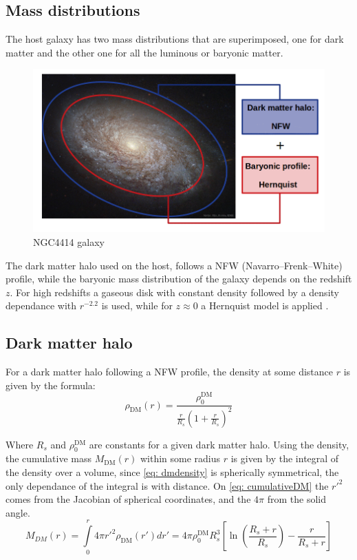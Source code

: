 		
		
		
	\subsection{Mass distributions}
		The host galaxy has two mass distributions that are superimposed, one for dark matter and the other one for all the luminous or baryonic matter.
		\begin{figure}[h]
			\centering
			\includegraphics[width=0.7\linewidth]{Figures/NGC4414_modified}
			\caption{NGC4414 galaxy }
		\end{figure}
	
		The dark matter halo used on the host, follows a NFW (Navarro–Frenk–White) profile, while the baryonic mass distribution of the galaxy depends on the redshift $z$. For high redshifts a gaseous disk with constant density followed by a density dependance with $r^{-2.2}$ is used, while for $z \approx 0$ a Hernquist model is applied \cite{choksi2017recoiling}.
		
	\subsection{Dark matter halo}
		For a dark matter halo following a NFW profile, the density at some distance $r$ is given by the formula:
		\begin{equation}\label{eq: dmdensity}
			\rho_\text{DM}(r) = \dfrac{\rho_0^\text{DM}}{\frac{r}{R_s}\left(1 + \frac{r}{R_s}\right)^2}
		\end{equation}
		
		Where $R_s$ and $\rho_0^\text{DM}$ are constants for a given dark matter halo. Using the density, the cumulative mass $M_\text{DM}(r)$ within some radius $r$ is given by the integral of the density over a volume, since \autoref{eq: dmdensity} is spherically symmetrical, the only dependance of the integral is with distance. On \autoref{eq: cumulativeDM} the $r'^2$ comes from the Jacobian of spherical coordinates, and the $4\pi$ from the solid angle.
		\begin{equation}\label{eq: cumulativeDM}
			M_{DM}(r) = \int\limits_0^{r} 4\pi {r'}^2\rho_\text{DM}(r')dr' = 4\pi\rho_0^\text{DM}R_s^3\left[\ln\left(\dfrac{R_s + r}{R_s}\right) - \dfrac{r}{R_s + r}\right]
		\end{equation}
		
